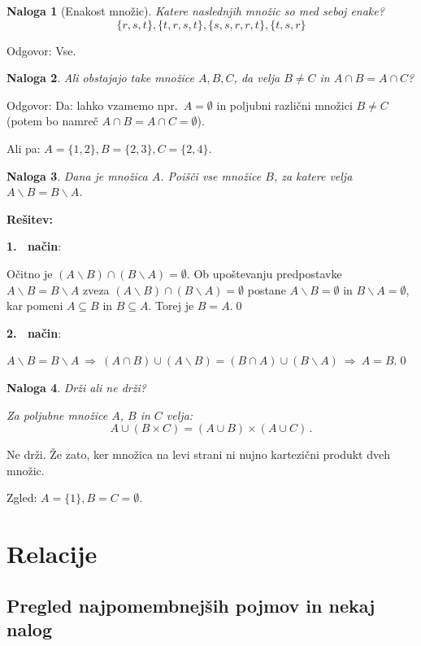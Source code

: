 \documentclass[11pt,paper=b5,footinclude,headinclude]{scrbook} %
\def\sledi {{~\Rightarrow~}}
\newtheorem*{problem}{Naloga}
\begin{document}
\begin{problem}[Enakost množic]
Katere naslednjih množic so med seboj enake?
$$\{r,s,t\}, \{t,r,s,t\}, \{s,s,r,r,t\}, \{t,s,r\}$$
\end{problem}

Odgovor: Vse.

\bigskip
\begin{problem}
Ali obstajajo take množice $A, B, C$, da velja $B\neq C$ in $A\cap B = A\cap C$?
\end{problem}

Odgovor: Da: lahko vzamemo npr.~$A = \emptyset$ in poljubni različni množici $B\neq C$
(potem bo namreč $A\cap B = A\cap C = \emptyset$).

Ali pa: $A = \{1,2\}, B = \{2,3\}, C = \{2,4\}$.


\begin{problem}
Dana je množica $A$. Poišči vse množice $B$, za katere velja
$A\backslash B = B\backslash A$.
\end{problem}

\textbf{Rešitev:}

\textbf{1.~ način}:

Očitno je
$(A\backslash B) \cap (B\backslash A)=\emptyset$.
Ob upoštevanju predpostavke $A\backslash B = B\backslash A$
zveza
$(A\backslash B) \cap (B\backslash A)=\emptyset$
postane
$A\backslash B =\emptyset$
in $B\backslash A =\emptyset$, kar pomeni
$A\subseteq B$ in $B\subseteq A$. Torej je $B = A$.\qed

\textbf{2.~ način}:

$A\backslash B = B\backslash A \sledi(A\cap B)\cup (A\backslash B) = (B\cap A)\cup (B\backslash A) \sledi A = B$.\qed

\begin{problem}
Drži ali ne drži?

Za poljubne množice $A$, $B$ in $C$ velja:
$$A\cup (B\times C) = (A\cup B)\times (A\cup C)\,.$$
\end{problem}

Ne drži. Že zato, ker množica na levi strani ni nujno kartezični produkt dveh množic.

Zgled: $A = \{1\}, B = C = \emptyset$.




\chapter{Relacije}

\section{Pregled najpomembnejših pojmov in nekaj nalog}
\end{document}
